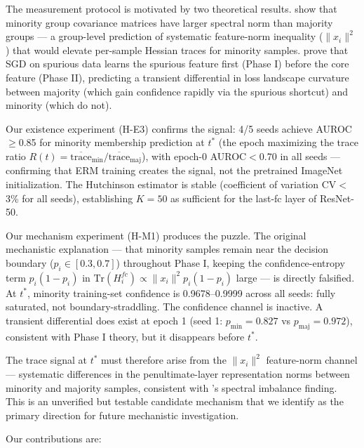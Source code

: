 The measurement protocol is motivated by two theoretical results. \cite{labonte2024spectral} show that minority group covariance matrices have larger spectral norm than majority groups --- a group-level prediction of systematic feature-norm inequality ($\|x_i\|^2$) that would elevate per-sample Hessian traces for minority samples. \cite{labonte2026phase} prove that SGD on spurious data learns the spurious feature first (Phase I) before the core feature (Phase II), predicting a transient differential in loss landscape curvature between majority (which gain confidence rapidly via the spurious shortcut) and minority (which do not).

Our existence experiment (H-E3) confirms the signal: 4/5 seeds achieve AUROC$\geq$0.85 for minority membership prediction at $t^*$ (the epoch maximizing the trace ratio $R(t) = \overline{\text{trace}}_{\text{min}} / \overline{\text{trace}}_{\text{maj}}$), with epoch-0 AUROC$<$0.70 in all seeds --- confirming that ERM training creates the signal, not the pretrained ImageNet initialization. The Hutchinson estimator is stable (coefficient of variation CV$<$3\% for all seeds), establishing $K{=}50$ as sufficient for the last-fc layer of ResNet-50.

Our mechanism experiment (H-M1) produces the puzzle. The original mechanistic explanation --- that minority samples remain near the decision boundary ($p_i\in[0.3,0.7]$) throughout Phase I, keeping the confidence-entropy term $p_i(1-p_i)$ in $\text{Tr}(H_i^{fc}) \propto \|x_i\|^2 p_i(1-p_i)$ large --- is directly falsified. At $t^*$, minority training-set confidence is 0.9678--0.9999 across all seeds: fully saturated, not boundary-straddling. The confidence channel is inactive. A transient differential does exist at epoch 1 (seed 1: $p_{\min}=0.827$ vs $p_{\text{maj}}=0.972$), consistent with Phase I theory, but it disappears before $t^*$.

The trace signal at $t^*$ must therefore arise from the $\|x_i\|^2$ feature-norm channel --- systematic differences in the penultimate-layer representation norms between minority and majority samples, consistent with \cite{labonte2024spectral}'s spectral imbalance finding. This is an unverified but testable candidate mechanism that we identify as the primary direction for future mechanistic investigation.

Our contributions are:

